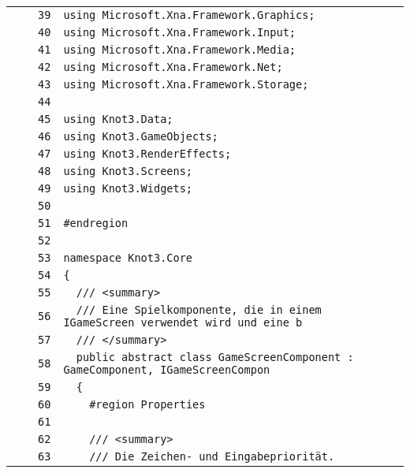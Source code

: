\documentclass[a4paper,10pt]{article}
\begin{document}
\begin{longtable}[l]{lrrl}
\cellcolor{gray} &  & \verb~39~ & \verb~using Microsoft.Xna.Framework.Graphics;~\\
\cellcolor{gray} &  & \verb~40~ & \verb~using Microsoft.Xna.Framework.Input;~\\
\cellcolor{gray} &  & \verb~41~ & \verb~using Microsoft.Xna.Framework.Media;~\\
\cellcolor{gray} &  & \verb~42~ & \verb~using Microsoft.Xna.Framework.Net;~\\
\cellcolor{gray} &  & \verb~43~ & \verb~using Microsoft.Xna.Framework.Storage;~\\
\cellcolor{gray} &  & \verb~44~ & \verb~~\\
\cellcolor{gray} &  & \verb~45~ & \verb~using Knot3.Data;~\\
\cellcolor{gray} &  & \verb~46~ & \verb~using Knot3.GameObjects;~\\
\cellcolor{gray} &  & \verb~47~ & \verb~using Knot3.RenderEffects;~\\
\cellcolor{gray} &  & \verb~48~ & \verb~using Knot3.Screens;~\\
\cellcolor{gray} &  & \verb~49~ & \verb~using Knot3.Widgets;~\\
\cellcolor{gray} &  & \verb~50~ & \verb~~\\
\cellcolor{gray} &  & \verb~51~ & \verb~#endregion~\\
\cellcolor{gray} &  & \verb~52~ & \verb~~\\
\cellcolor{gray} &  & \verb~53~ & \verb~namespace Knot3.Core~\\
\cellcolor{gray} &  & \verb~54~ & \verb~{~\\
\cellcolor{gray} &  & \verb~55~ & \verb~  /// <summary>~\\
\cellcolor{gray} &  & \verb~56~ & \verb~  /// Eine Spielkomponente, die in einem IGameScreen verwendet wird und eine b~\\
\cellcolor{gray} &  & \verb~57~ & \verb~  /// </summary>~\\
\cellcolor{gray} &  & \verb~58~ & \verb~  public abstract class GameScreenComponent : GameComponent, IGameScreenCompon~\\
\cellcolor{gray} &  & \verb~59~ & \verb~  {~\\
\cellcolor{gray} &  & \verb~60~ & \verb~    #region Properties~\\
\cellcolor{gray} &  & \verb~61~ & \verb~~\\
\cellcolor{gray} &  & \verb~62~ & \verb~    /// <summary>~\\
\cellcolor{gray} &  & \verb~63~ & \verb~    /// Die Zeichen- und Eingabepriorität.~\\

\end{longtable}
\end{document}
